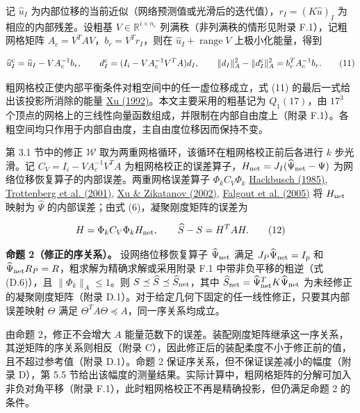 \documentclass[preprint,12pt,authoryear]{elsarticle}
\begin{document}
记 \(\widehat u_I\) 为内部位移的当前近似（网络预测值或光滑后的迭代值），\(r_I=(K\widehat u)_I\) 为相应的内部残差。设粗基 \(V\in\mathbb R^{i\times n_c}\) 列满秩（非列满秩的情形见附录 F.1），记粗网格矩阵 \(A_c=V^TAV\)，\(b_r=V^Tr_I\)，则在 \(\widehat u_I+\operatorname{range}V\) 上极小化能量，得到

\[
\widehat u_I^{\rm c}=\widehat u_I-VA_c^{-1}b_r,\qquad
d_I^{\rm c}=(I_i-VA_c^{-1}V^TA)d_I,\qquad
\|d_I\|_A^2-\|d_I^{\rm c}\|_A^2=b_r^TA_c^{-1}b_r.
\tag{11}
\]

粗网格校正使内部平衡条件对粗空间中的任一虚位移成立，式 (11) 的最后一式给出该投影所消除的能量 \href{https://doi.org/10.1137/1034116}{Xu (1992)}。本文主要采用的粗基记为 \(Q_1(17)\)，由 \(17^3\) 个顶点的网格上的三线性向量函数组成，并限制在内部自由度上（附录 F.1）。各粗空间均只作用于内部自由度，主自由度位移因而保持不变。

第 3.1 节中的修正 \(\mathcal W\) 取为两重网格循环，该循环在粗网格校正前后各进行 \(k\) 步光滑。记 \(C_V=I_i-VA_c^{-1}V^TA\) 为粗网格校正的误差算子，\(H_{\rm net}=J_I(\widehat\Psi_{\rm net}-\Psi)\) 为网络位移恢复算子的内部误差。两重网格误差算子 \(\Phi_kC_V\Phi_k\) \href{https://doi.org/10.1007/978-3-662-02427-0}{Hackbusch (1985)}, \href{https://shop.elsevier.com/books/multigrid/trottenberg/978-0-12-701070-0}{Trottenberg et al. (2001)}, \href{https://doi.org/10.1090/S0894-0347-02-00398-3}{Xu \& Zikatanov (2002)}, \href{https://doi.org/10.1002/nla.437}{Falgout et al. (2005)} 将 \(H_{\rm net}\) 映射为 \(\widehat\Psi\) 的内部误差；由式 (6)，凝聚刚度矩阵的误差为

\[
H=\Phi_kC_V\Phi_kH_{\rm net},\qquad
\widehat S-S=H^TAH.
\tag{12}
\]

\textbf{命题 2（修正的序关系）。} 设网络位移恢复算子 \(\widehat\Psi_{\rm net}\) 满足 \(J_P\widehat\Psi_{\rm net}=I_p\) 和 \(\widehat\Psi_{\rm net}R_P=R\)，粗求解为精确求解或采用附录 F.1 中带非负平移的粗逆（式 (D.6)），且 \(\|\Phi_k\|_A\le1\)。则 \(S\preceq\widehat S\preceq\widehat S_{\rm net}\)，其中 \(\widehat S_{\rm net}=\widehat\Psi_{\rm net}^TK\widehat\Psi_{\rm net}\) 为未经修正的凝聚刚度矩阵（附录 D.1）。对于给定几何下固定的任一线性修正，只要其内部误差映射 \(\Theta\) 满足 \(\Theta^TA\Theta\preceq A\)，同一序关系均成立。

由命题 2，修正不会增大 \(A\) 能量范数下的误差。装配刚度矩阵继承这一序关系，其逆矩阵的序关系则相反（附录 C），因此修正后的装配柔度不小于修正前的值，且不超过参考值（附录 D.1）。命题 2 保证序关系，但不保证误差减小的幅度（附录 D），第 5.5 节给出该幅度的测量结果。实际计算中，粗网格矩阵的分解可加入非负对角平移（附录 F.1），此时粗网格校正不再是精确投影，但仍满足命题 2 的条件。
\end{document}

